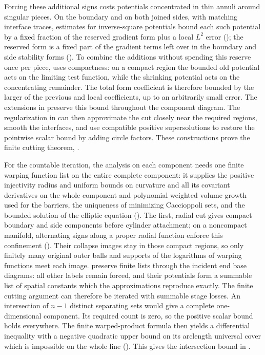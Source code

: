 Forcing these additional signs costs potentials concentrated in thin
annuli around singular pieces. On the boundary and on both joined sides,
with matching interface traces, estimates for inverse-square potentials bound each such potential by
a fixed fraction of the reserved gradient form plus a local \(L^2\) error
(); the reserved form is a fixed part of the gradient
terms left over in the boundary and side stability forms (). To combine the additions without spending
this reserve once per piece,  uses compactness:
on a compact region the bounded old potential acts on the limiting
test function, while the shrinking potential acts on the concentrating
remainder. The total form coefficient is therefore bounded by the
larger of the previous and local coefficients, up to an arbitrarily
small error. The extensions in
 preserve this bound throughout the component
diagram. The regularization in  can then approximate
the cut closely near the required regions, smooth the interfaces, and use
compatible positive supersolutions to restore the pointwise scalar
bound by adding circle factors. These constructions prove the finite
cutting theorem, .

For the countable iteration, the analysis on each component needs one
finite warping function list on the entire complete component: it supplies the
positive injectivity radius and uniform bounds on curvature and all its
covariant derivatives on the whole component and polynomial weighted volume growth
used for the barriers, the uniqueness of minimizing Caccioppoli sets, and the
bounded solution of the elliptic equation (). The first, radial cut gives
compact boundary and side components before cylinder attachment; on a
noncompact manifold, alternating signs along a proper radial function
enforce this confinement (). Their collapse
images stay in those compact regions, so only finitely many original
outer balls and supports of the logarithms of warping functions meet each image.
 preserve finite lists through
the incident end base diagrams: all other labels remain forced, and their
potentials form a summable list of spatial constants which the
approximations reproduce exactly. The finite cutting argument can
therefore be iterated with summable stage losses. An intersection of
\(n-1\) distinct separating sets would give a complete one-dimensional component.
Its required count is zero, so the positive scalar bound holds
everywhere. The finite warped-product formula then yields a differential
inequality with a negative quadratic upper bound on its arclength universal cover which is impossible on
the whole line (). This gives the
intersection bound in .

